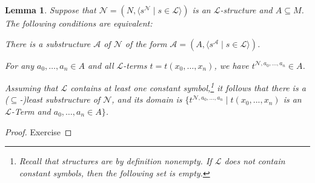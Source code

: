 \documentclass[a4paper, 11pt]{amsart}
\newtheorem{lemma}[lemma]{Lemma}
\theoremstyle{remark}
\newcommand{\cA}{\mathcal A}
\newcommand{\cL}{\mathcal L}
\newcommand{\cN}{\mathcal N}
\newenvironment{enumerate-(a)}{\begin{enumerate}[label={\upshape (\alph*)}, leftmargin=2pc]}{\end{enumerate}}
\newenvironment{enumerate-(1)}{\begin{enumerate}[label={\upshape (\arabic*)}, leftmargin=2pc]}{\end{enumerate}}
\begin{document}
\begin{lemma} 
\label{characterisation of substructures} 
Suppose that $\cN=(N,\langle s^\cN\mid s\in \cL \rangle)$ is an $\cL$-structure and $A\subseteq M$. 
The following conditions are equivalent: 
\begin{enumerate-(a)} 
\item 
\label{characterisation of substructures 1} 
There is a substructure $\cA$ of $\cN$ of the form $\cA=(A,\langle s^\cA\mid s\in \cL \rangle)$. 
\item 
\label{characterisation of substructures 2} 
For any $a_0,\dots,a_n\in A$ and all $\cL$-terms $t=t(x_0,\dots,x_n)$, we have $t^{\cN,a_0,\dots,a_n}\in A$. 
\end{enumerate-(a)} 
Assuming that $\cL$ contains at least one constant symbol,\footnote{Recall that structures are by definition nonempty. If $\cL$ does not contain constant symbols, then the following set is empty.} it follows that there is a ($\subseteq$-)least substructure of $\cN$, and its domain is $\{t^{\cN,a_0,\dots, a_n} \mid t(x_0,...,x_n)$ is an $\cL$-Term and $a_0,\dots, a_n\in A\}$. 
\end{lemma} 
\begin{proof} 
Exercise 
\end{proof} 
\iffalse 
\begin{proof} 
\ref{characterisation of substructures 1}$\Rightarrow$\ref{characterisation of substructures 2}: 
This is a straightforward induction on terms. 
For constant symbols $c\in \cL$, $c^\cA=c^\cN$ since $\cA$ is a substructure of $\cN$, so $c^\cN=c^\cA \in A$. 
For a variable $x$ and $a\in A$, $x^{\cN,a}=a \in A$. 
Suppose that $f(t_0,\dots,t_k)$ is an $\cL$-term, $x_{j_{i,0}},\dots,x_{j_{i,l_i}}$ are the free variables of $t_i$ and $t_i^{\cN,a_{j_{i,0}},\dots,a_{i,j_{l_i}}}\in A$, for all $i\leq k$. 
Then $f(t_0,\dots,t_k)^{\cN,a_0,\dots, a_n}=f^\cN(t_0^{\cN,a_{j_{0,0}},\dots,a_{0,j_{l_0}}} ,\dots,t_k^{\cN,a_{j_{k,0}},\dots,a_{k,j_{l_k}}})\in A$, since  $\cA$ is a substructure of $\cN$. 

\ref{characterisation of substructures 2}$\Rightarrow$\ref{characterisation of substructures 1}: 
The definition of substructure is the special case of \ref{characterisation of substructures 2} where $t$ is a constant symbol, a variable or a functions symbol. 
\end{proof} 
\fi 
\end{document}
